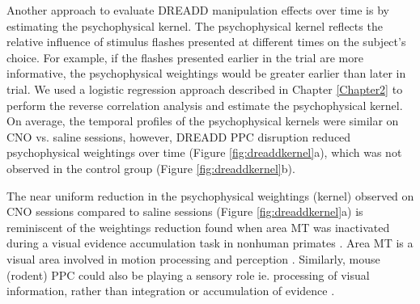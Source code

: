 Another approach to evaluate DREADD manipulation effects over time is by estimating the psychophysical kernel. The psychophysical kernel reflects the relative influence of stimulus flashes presented at different times on the subject's choice. For example, if the flashes presented earlier in the trial are more informative, the psychophysical weightings would be greater earlier than later in trial. We used a logistic regression approach described in Chapter \ref{Chapter2} \parencite{Katz2016DissociatedStream} to perform the reverse correlation analysis and estimate the psychophysical kernel.  On average, the temporal profiles of the psychophysical kernels were similar on CNO vs. saline sessions, however, DREADD PPC disruption reduced psychophysical weightings over time (Figure \ref{fig:dreaddkernel}a), which was not observed in the control group (Figure \ref{fig:dreaddkernel}b).

The near uniform reduction in the psychophysical weightings (kernel) observed on CNO sessions compared to saline sessions (Figure \ref{fig:dreaddkernel}a) is reminiscent of the weightings reduction found when area MT was inactivated during a visual evidence accumulation task in nonhuman primates \textcite{Katz2016DissociatedStream}. Area MT is a visual area involved in motion processing and perception \parencite{Albright1984DirectionMacaque,Newsome1988AOf}. Similarly, mouse (rodent) PPC could also be playing a sensory role ie. processing of visual information, rather than integration or accumulation of evidence \parencite{Licata2016PosteriorRats}.